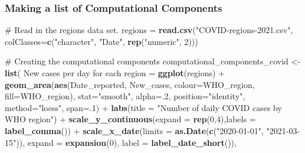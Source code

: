 \documentclass[
]{article}
\newenvironment{Shaded}{\begin{snugshade}}{\end{snugshade}}
\newcommand{\CommentTok}[1]{\textcolor[rgb]{0.54,0.53,0.53}{#1}}
\newcommand{\DataTypeTok}[1]{\textcolor[rgb]{0.00,0.34,0.68}{#1}}
\newcommand{\DecValTok}[1]{\textcolor[rgb]{0.69,0.50,0.00}{#1}}
\newcommand{\KeywordTok}[1]{\textcolor[rgb]{0.12,0.11,0.11}{\textbf{#1}}}
\newcommand{\NormalTok}[1]{\textcolor[rgb]{0.12,0.11,0.11}{#1}}
\newcommand{\OperatorTok}[1]{\textcolor[rgb]{0.12,0.11,0.11}{#1}}
\newcommand{\StringTok}[1]{\textcolor[rgb]{0.75,0.01,0.01}{#1}}
\begin{document}
\hypertarget{making-a-list-of-computational-components}{%
\subsubsection{Making a list of Computational
Components}\label{making-a-list-of-computational-components}}

\begin{Shaded}
\begin{Highlighting}[]
\CommentTok{\# Read in the regions data set.}
\NormalTok{regions =}\StringTok{ }\KeywordTok{read.csv}\NormalTok{(}\StringTok{"COVID{-}regions{-}2021.csv"}\NormalTok{, }
                    \DataTypeTok{colClasses=}\KeywordTok{c}\NormalTok{(}\StringTok{"character"}\NormalTok{, }\StringTok{"Date"}\NormalTok{, }\KeywordTok{rep}\NormalTok{(}\StringTok{"numeric"}\NormalTok{, }\DecValTok{2}\NormalTok{)))}

\CommentTok{\# Creating the computational components}
\NormalTok{computational\_components\_covid \textless{}{-}}\StringTok{ }\KeywordTok{list}\NormalTok{( }
  \StringTok{\textasciigrave{}}\DataTypeTok{New cases per day for each region}\StringTok{\textasciigrave{}}\NormalTok{ =}\StringTok{ }\KeywordTok{ggplot}\NormalTok{(regions) }\OperatorTok{+}\StringTok{ }
\StringTok{    }\KeywordTok{geom\_area}\NormalTok{(}\KeywordTok{aes}\NormalTok{(Date\_reported, New\_cases, }\DataTypeTok{colour=}\NormalTok{WHO\_region, }\DataTypeTok{fill=}\NormalTok{WHO\_region), }
              \DataTypeTok{stat=}\StringTok{"smooth"}\NormalTok{, }
              \DataTypeTok{alpha=}\NormalTok{.}\DecValTok{2}\NormalTok{, }\DataTypeTok{position=}\StringTok{"identity"}\NormalTok{,}
              \DataTypeTok{method=}\StringTok{"loess"}\NormalTok{, }\DataTypeTok{span=}\NormalTok{.}\DecValTok{1}\NormalTok{) }\OperatorTok{+}
\StringTok{    }\KeywordTok{labs}\NormalTok{(}\DataTypeTok{title =} \StringTok{"Number of daily COVID cases by WHO region"}\NormalTok{) }\OperatorTok{+}
\StringTok{    }\KeywordTok{scale\_y\_continuous}\NormalTok{(}\DataTypeTok{expand =} \KeywordTok{rep}\NormalTok{(}\DecValTok{0}\NormalTok{,}\DecValTok{4}\NormalTok{),}\DataTypeTok{labels =} \KeywordTok{label\_comma}\NormalTok{()) }\OperatorTok{+}
\StringTok{    }\KeywordTok{scale\_x\_date}\NormalTok{(}\DataTypeTok{limits =} \KeywordTok{as.Date}\NormalTok{(}\KeywordTok{c}\NormalTok{(}\StringTok{"2020{-}01{-}01"}\NormalTok{, }\StringTok{"2021{-}03{-}15"}\NormalTok{)),}
                 \DataTypeTok{expand =} \KeywordTok{expansion}\NormalTok{(}\DecValTok{0}\NormalTok{),}
                 \DataTypeTok{label =} \KeywordTok{label\_date\_short}\NormalTok{()),}


\end{Highlighting}
\end{Shaded}
\end{document}
